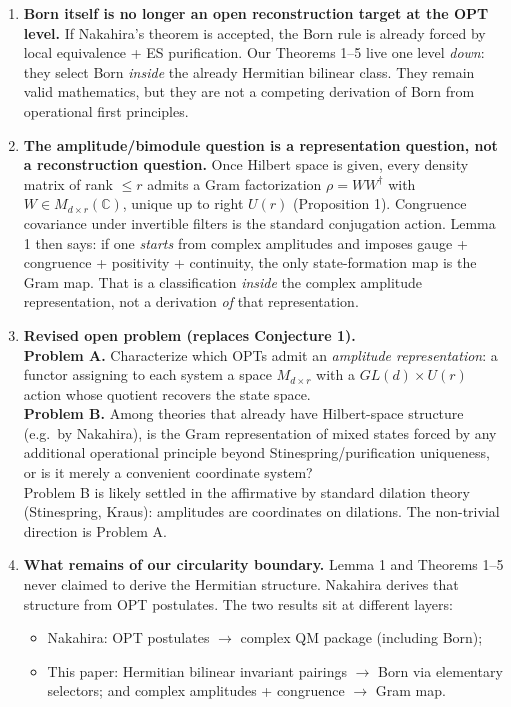 \documentclass[
]{article}
\providecommand{\tightlist}{%
  \setlength{\itemsep}{0pt}\setlength{\parskip}{0pt}}
\begin{document}
\begin{enumerate}
\def\labelenumi{\arabic{enumi}.}
\item
  \textbf{Born itself is no longer an open reconstruction target at the
  OPT level.} If Nakahira's theorem is accepted, the Born rule is
  already forced by local equivalence + ES purification. Our Theorems
  1--5 live one level \emph{down}: they select Born \emph{inside} the
  already Hermitian bilinear class. They remain valid mathematics, but
  they are not a competing derivation of Born from operational first
  principles.
\item
  \textbf{The amplitude/bimodule question is a representation question,
  not a reconstruction question.} Once Hilbert space is given, every
  density matrix of rank \(\leq r\) admits a Gram factorization
  \(\rho=WW^\dagger\) with \(W\in M_{d\times r}(\mathbb C)\), unique up
  to right \(U(r)\) (Proposition 1). Congruence covariance under
  invertible filters is the standard conjugation action. Lemma 1 then
  says: if one \emph{starts} from complex amplitudes and imposes gauge +
  congruence + positivity + continuity, the only state-formation map is
  the Gram map. That is a classification \emph{inside} the complex
  amplitude representation, not a derivation \emph{of} that
  representation.
\item
  \textbf{Revised open problem (replaces Conjecture 1).}\\
  \textbf{Problem A.} Characterize which OPTs admit an \emph{amplitude
  representation}: a functor assigning to each system a space
  \(M_{d\times r}\) with a \(GL(d)\times U(r)\) action whose quotient
  recovers the state space.\\
  \textbf{Problem B.} Among theories that already have Hilbert-space
  structure (e.g.~by Nakahira), is the Gram representation of mixed
  states forced by any additional operational principle beyond
  Stinespring/purification uniqueness, or is it merely a convenient
  coordinate system?\\
  Problem B is likely settled in the affirmative by standard dilation
  theory (Stinespring, Kraus): amplitudes are coordinates on dilations.
  The non-trivial direction is Problem A.
\item
  \textbf{What remains of our circularity boundary.} Lemma 1 and
  Theorems 1--5 never claimed to derive the Hermitian structure.
  Nakahira derives that structure from OPT postulates. The two results
  sit at different layers:

  \begin{itemize}
  \tightlist
  \item
    Nakahira: OPT postulates \(\to\) complex QM package (including
    Born);
  \item
    This paper: Hermitian bilinear invariant pairings \(\to\) Born via
    elementary selectors; and complex amplitudes + congruence \(\to\)
    Gram map.
  \end{itemize}
\end{enumerate}
\end{document}
